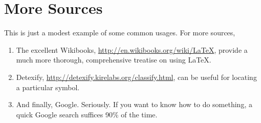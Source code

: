 \documentclass[11pt]{scrartcl}
\theoremstyle{plain} %
\theoremstyle{definition}
\theoremstyle{remark}
\begin{document}
\section{More Sources}
This is just a modest example of some common usages. For more sources,
\begin{enumerate}
  \item The excellent Wikibooks,
    \url{http://en.wikibooks.org/wiki/LaTeX},
    provide a much more thorough, comprehensive treatise on using \LaTeX.
  \item Detexify, \url{http://detexify.kirelabs.org/classify.html},
    can be useful for locating a particular symbol.
  \item And finally, Google. Seriously.
    If you want to know how to do something,
    a quick Google search suffices 90\% of the time.
\end{enumerate}
\end{document}
